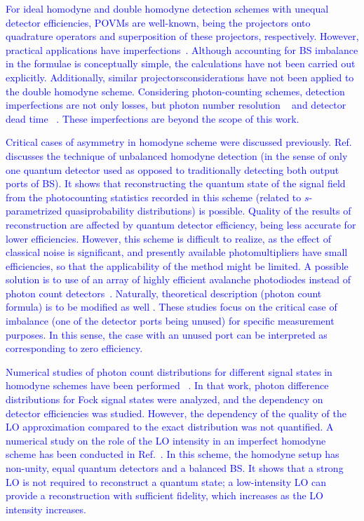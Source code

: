 \documentclass[%
reprint,
superscriptaddress,
 amsmath,amssymb,amsfonts,
 aps,
 pra,
 longbibliography
]{revtex4-2}
\begin{document}
\textcolor{blue}{For ideal homodyne and double homodyne detection
  schemes with unequal detector efficiencies, POVMs are well-known,
  being the projectors onto quadrature operators and superposition of
  these projectors, respectively.  
However, practical applications have imperfections~\cite{hajomer2025finite}. 
Although accounting for BS imbalance in the formulae is conceptually
simple, the calculations have not been carried out
explicitly. Additionally, similar projectorsconsiderations have not
been applied to the double homodyne scheme. Considering
photon-counting schemes, detection imperfections are not only losses,
but photon number resolution
\mbox{~\cite{len2022realistic,yeremenko2024realistic}} and detector
dead time \mbox{~\cite{ len2022realistic, reutov2021photon}}. These
imperfections are beyond the scope of this work.} 

\textcolor{blue}{Critical cases of asymmetry in homodyne scheme were
  discussed previously. Ref.~\cite{PhysRevA.53.4528} discusses the
  technique of unbalanced homodyne detection (in the sense of only one
  quantum detector used as opposed to traditionally detecting both
  output ports of BS). It shows that reconstructing the quantum state
  of the signal field from the photocounting statistics recorded in
  this scheme (related to $s$-parametrized quasiprobability
  distributions) is possible. Quality of the results of reconstruction
  are affected by quantum detector efficiency, being less accurate for
  lower efficiencies. However,  
this scheme is difficult to realize, as the effect of classical noise
is significant, and presently available photomultipliers have small
efficiencies, so that the applicability of the method might be
limited. A possible solution is to use of an array of highly efficient
avalanche photodiodes instead of photon count
detectors\mbox{~\cite{PhysRevA.53.4528,
    PhysRevA.101.031801}}. Naturally, theoretical description (photon
count formula) is to be modified as well
\mbox{\cite{PhysRevA.85.023820,PhysRevA.92.053835}}. These studies
focus on the critical case of imbalance (one of the detector ports
being unused) for specific measurement purposes. In this sense, the
case with an unused port can be interpreted as corresponding to zero
efficiency.} 

\textcolor{blue}{
Numerical studies of photon count distributions for different signal
states in homodyne schemes have been performed
{~\cite{freyberger1993photon}}. In that work, photon difference
distributions for Fock signal states were analyzed, and the dependency
on detector efficiencies was studied. However, the dependency of the
quality of the LO approximation compared to the exact distribution was
not quantified. A numerical study on the role of the LO intensity in
an imperfect homodyne scheme has been conducted in
Ref.{~\cite{OLIVARES2020126354}}. In this scheme, the homodyne setup
has non-unity, equal quantum detectors and a balanced BS. It shows
that a strong LO is not required to reconstruct a quantum state; a
low-intensity LO can provide a reconstruction with sufficient
fidelity, which increases as the LO intensity increases.} 
\end{document}
